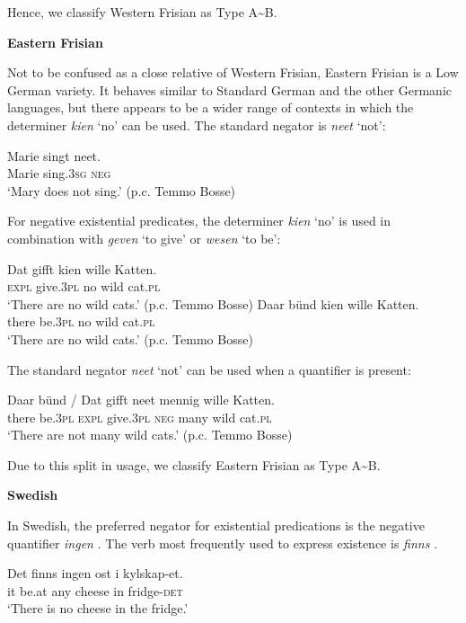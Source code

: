 ﻿\documentclass[output=paper]{langsci/langscibook}
\begin{document}
\begin{unindented}
Hence, we classify Western Frisian as Type A{\textasciitilde}B.

\textbf{Eastern Frisian}

Not to be confused as a close relative of Western Frisian, Eastern Frisian is a Low German variety. It behaves similar to Standard German and the other Germanic languages, but there appears to be a wider range of contexts in which the determiner \textit{kien} `no' can be used. The standard negator is \textit{neet} `not':
%
\begin{exe}\ex \gll Marie singt neet. \\
Marie sing.\textsc{3sg} \textsc{neg} \\
    \glt `Mary does not sing.' (p.c. Temmo Bosse)
    \end{exe} 

For negative existential predicates, the determiner \textit{kien} `no' is used in combination with \textit{geven} `to give' or \textit{wesen} `to be':
%
\begin{exe}\ex \gll Dat gifft kien wille Katten. \\
\textsc{expl}  give.\textsc{3pl} no wild cat.\textsc{pl} \\
    \glt `There are no wild cats.' (p.c. Temmo Bosse)
\ex \gll Daar bünd   kien wille Katten. \\
there be.\textsc{3pl} no   wild  cat.\textsc{pl} \\
    \glt `There are no wild cats.' (p.c. Temmo Bosse)
    \end{exe}

The standard negator \textit{neet} `not' can be used when a quantifier is present:
%
\begin{exe}\ex \gll Daar bünd / Dat gifft neet mennig wille Katten. \\
there be.\textsc{3pl} {} \textsc{expl} give.\textsc{3pl} \textsc{neg} many     wild cat\textsc{.pl} \\
    \glt `There are not many wild cats.' (p.c. Temmo Bosse)
    \end{exe}

Due to this split in usage, we classify Eastern Frisian as Type A{\textasciitilde}B. 

\textbf{Swedish}

In Swedish, the preferred negator for existential predications is the negative quantifier \textit{ingen} \citep{Bordal2017}. The verb most frequently used to express existence is \textit{finns} \citep[9]{Bordal2017}. 
%
\begin{exe}\ex \gll Det finns ingen ost i   kylskap-et. \\
it be.at any cheese in fridge-\textsc{det} \\
    \glt `There is no cheese in the fridge.' \citep[115]{Veselinova2013}
    \end{exe}


\end{unindented}
\end{document}
